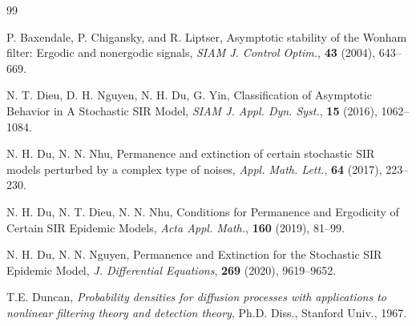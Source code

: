 \documentclass[12pt]{amsart}
\theoremstyle{remark}
\numberwithin{equation}{section}
\numberwithin{equation}{section}
\newcommand{\1}{\boldsymbol{1}}
\begin{document}
\begin{thebibliography}{99}
{\small
\setlength{\baselineskip}{0.10in}
\parskip=0pt

 P. Baxendale, P. Chigansky, and R. Liptser, Asymptotic stability of
the Wonham filter: Ergodic and nonergodic signals, {\it SIAM J. Control
Optim.}, {\bf 43} (2004), 643--669.







 N. T. Dieu, D. H. Nguyen, N. H. Du, G. Yin, Classification of Asymptotic Behavior in A Stochastic SIR Model, {\it SIAM J. Appl. Dyn. Syst.}, {\bf 15} (2016),
1062--1084.

 N. H. Du, N. N. Nhu, Permanence and extinction of certain stochastic SIR models perturbed by a complex type of noises, {\it Appl. Math. Lett.}, {\bf 64} (2017), 223--230.

N. H. Du, N. T. Dieu, N. N. Nhu,  Conditions for Permanence and Ergodicity of Certain SIR Epidemic Models, {\it Acta Appl. Math.}, {\bf 160} (2019), 81--99.


 N. H. Du, N. N. Nguyen, Permanence and Extinction for the Stochastic SIR Epidemic Model, {\it J. Differential Equations}, {\bf 269} (2020), 9619--9652.


T.E. Duncan,
{\it Probability densities for diffusion processes with applications to nonlinear filtering theory and detection theory}, Ph.D. Diss., Stanford Univ., 1967.

}
\end{thebibliography}
\end{document}
